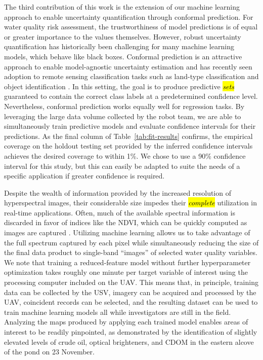 \documentclass[remotesensing,article,accept,pdftex,moreauthors]{Definitions/mdpi}
\begin{document}
The third contribution of this work is the extension of our machine learning approach to enable uncertainty quantification through conformal prediction. For water quality risk assessment, the trustworthiness of model predictions is of equal or greater importance to the values themselves. However, robust uncertainty quantification has historically been challenging for many machine learning models, which behave like black boxes.
Conformal prediction is an attractive approach to enable model-agnostic uncertainty estimation and has recently seen adoption to remote sensing classification tasks such as land-type classification and object identification \cite{valle2023quantifying, zhu2024inductive}. In this setting, the goal is to produce predictive \textit{\hl{sets}} guaranteed to contain the correct class labels at a predetermined confidence level. Nevertheless, conformal prediction works equally well for regression tasks. By leveraging the large data volume collected by the robot team, we are able to simultaneously train predictive models and evaluate confidence intervals for their predictions. As the final column of Table~\ref{tab:fit-results} confirms, the empirical coverage on the holdout testing set provided by the inferred confidence intervals achieves the desired coverage to within 1\%. We chose to use a 90\% confidence interval for this study, but this can easily be adapted to suite the needs of a specific application if greater confidence is required. 

Despite the wealth of information provided by the increased resolution of hyperspectral images, their considerable size impedes their \textit{\hl{complete}} utilization in real-time applications. Often, much of the available spectral information is discarded in favor of indices like the NDVI, which can be quickly computed as images are captured \cite{horstrand2019uav}. Utilizing machine learning allows us to take advantage of the full spectrum captured by each pixel while simultaneously reducing the size of the final data product to single-band ``images'' of selected water quality variables. We note that training a reduced-feature model without further hyperparameter optimization takes roughly one minute per target variable of interest using the processing computer included on the UAV. This means that, in principle, training data can be collected by the USV, imagery can be acquired and processed by the UAV, coincident records can be selected, and the resulting dataset can be used to train machine learning models all while investigators are still in the field. Analyzing the maps produced by applying each trained model enables areas of interest to be readily pinpointed, as demonstrated by the identification of slightly elevated levels of %
crude oil, optical brighteners, and CDOM in the eastern alcove of the pond on 23 November. 
\end{document}
